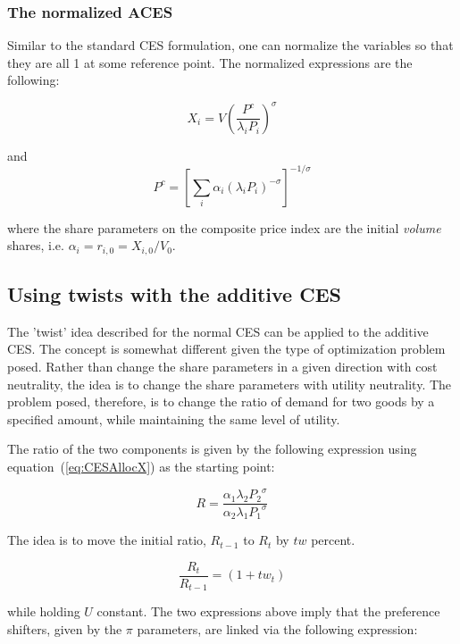 \subsubsection{The normalized ACES}

Similar to the standard CES formulation, one can normalize the variables so that they are all 1 at some
reference point. The normalized expressions are the following:

\[
X_i = V {\left( \frac {P^c} {\lambda_i P_i} \right)}^\sigma
\]

\noindent and
\[
P^c={\left[ \sum\limits_i {\alpha_i \left( \lambda_i P_i \right)^{-\sigma}} \right]}^{-1/\sigma}
\]

\noindent where the share parameters on the composite price index are the initial \emph{volume} shares,
i.e. $\alpha_i = r_{i,0} = X_{i,0}/V_0$.

\subsection{Using twists with the additive CES}

The 'twist' idea described for the normal CES can be applied to the additive CES. The concept
is somewhat different given the type of optimization problem posed. Rather than change
the share parameters in a given direction with cost neutrality, the idea is to change the
share parameters with utility neutrality. The problem posed, therefore, is
to change the ratio of demand for two goods by a specified amount, while maintaining the same
level of utility.

The ratio of the two components is given by the following expression using
equation~(\ref{eq:CESAllocX}) as the starting point:

\begin{displaymath}
R=\frac{{{\alpha }_{1}}{\lambda _{2}{P}_{2}}^{\sigma }}
	       {{{\alpha}_{2}}{\lambda _{1} {P}_{1}}^{\sigma }}
\end{displaymath}

\noindent The idea is to move the initial ratio, $R_{t-1}$ to $R_t$ by $tw$ percent.

\begin{displaymath}
\frac{{{R}_{t}}}{{{R}_{t-1}}}=(1+t{{w}_{t}})
\end{displaymath}

\noindent while holding $U$ constant. The two expressions above
imply that the preference shifters, given by the $\pi$ parameters, are linked via the
following expression:


